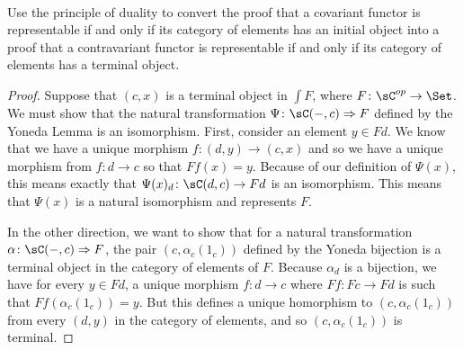 \documentclass[main.tex]{subfiles}
\begin{document}
\paragraph{}
\begin{exercise}
Use the principle of duality to convert the proof that a covariant functor is
representable if and only if its category of elements has an initial object
into a proof that a contravariant functor is representable if and only if its
category of elements has a terminal object.
\end{exercise}
\begin{proof}
Suppose that $(c,x)$ is a terminal object in $\int F$, where $F\colon \sC^{op}
\rightarrow \Set$. We must show that the natural transformation $\Psi\colon \sC(-,c)
\Rightarrow F$ defined by the Yoneda Lemma is an isomorphism. First, consider
an element $y \in Fd$. We know that we have a unique morphism $f\colon (d,y)
\rightarrow (c,x)$ and so we have a unique morphism from $f\colon d \rightarrow c$
so that $Ff(x) = y$.  Because of our definition of $\Psi(x)$, this means
exactly that $\Psi(x)_d\colon \sC(d,c) \rightarrow Fd$ is an isomorphism. This means
that $\Psi(x)$ is a natural isomorphism and represents $F$.

In the other direction, we want to show that for a natural transformation
$\alpha\colon \sC(-,c) \Rightarrow F$, the pair $(c,\alpha_c(1_c))$ defined by the
Yoneda bijection is a terminal object in the category of elements of $F$.
Because $\alpha_d$ is a bijection, we have for every $y \in Fd$, a unique
morphism $f\colon d \rightarrow c$ where $Ff\colon Fc \rightarrow Fd$ is such that
$Ff(\alpha_c(1_c)) = y$. But this defines a unique homorphism to $(c,
\alpha_c(1_c))$ from every $(d,y)$ in the category of elements, and so $(c,
\alpha_c(1_c))$ is terminal.
\end{proof}
\end{document}
